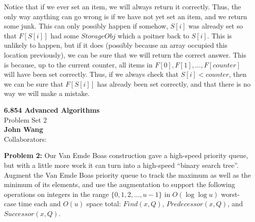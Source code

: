 \documentclass[psamsfonts]{amsart}
\newenvironment{sol}{\vspace{0.25cm}{\large \bfseries Solution:}}{\qedsymbol}
\newenvironment{prob}[1]{\begin{framed}{\large \bfseries Problem #1:}}{\end{framed}}
\newcommand{\makenewtitle}{
\begin{center}
{\huge \bfseries 6.854 Advanced Algorithms} \\
Problem Set 2\\
\vspace{0.25cm}
{\bfseries John Wang} \\
Collaborators:
\end{center}
\vspace{0.5cm}
}
\begin{document}
\begin{sol}
Notice that if we ever set an item, we will always return it correctly. Thus, the only way anything can go wrong is if we have not yet set an item, and we return some junk. This can only possibly happen if somehow, $S[i]$ was already set so that $F[S[i]]$ had some $StorageObj$ which a poitner back to $S[i]$. This is unlikely to happen, but if it does (possibly because an array occupied this location previously), we can be sure that we will return the correct answer. This is because, up to the current counter, all items in $F[0], F[1], \ldots, F[counter]$ will have been set correctly. Thus, if we always check that $S[i] < counter$, then we can be sure that $F[S[i]]$ has already been set correctly, and that there is no way we will make a mistake.
\end{sol}

\newpage
\makenewtitle

\begin{prob}{2}
Our Van Emde Boas construction gave a high-speed priority queue, but with a little more work it can turn into a high-speed ``binary search tree''. Augment the Van Emde Boas priority queue to track the maximum as well as the minimum of its elements, and use the augmentation to support the following operations on integers in the range $\{0,1,2,\ldots, u-1\}$ in $O(\log \log u)$ worst-case time each and $O(u)$ space total: $Find(x, Q)$, $Predecessor(x, Q)$, and $Successor(x,Q)$. 
\end{prob}
\end{document}
